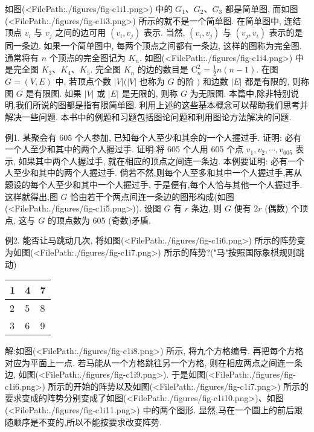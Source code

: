 如图(<FilePath:./figures/fig-c1i1.png>) 中的 $G_1 、 G_2 、 G_3$ 都是简单图, 而如图(<FilePath:./figures/fig-c1i3.png>) 所示的就不是一个简单图.
在简单图中, 连结顶点 $v_i$ 与 $v_j$ 之间的边可用 $\left(v_i, v_j\right)$ 表示.
当然, $\left(v_i, v_j\right)$ 与 $\left(v_j, v_i\right)$ 表示的是同一条边.
如果一个简单图中, 每两个顶点之间都有一条边, 这样的图称为完全图.
通常将有 $n$ 个顶点的完全图记为 $K_n$. 如图(<FilePath:./figures/fig-c1i4.png>) 中是完全图 $K_3 、 K_4 、 K_5$. 完全图 $K_n$ 的边的数目是 $\mathrm{C}_n^2=\frac{1}{2} n(n-1)$.
在图 $G=(V, E)$ 中, 若顶点个数 $|V|(|V|$ 也称为 $G$ 的阶 $)$ 和边数 $|E|$ 都是有限的, 则称图 $G$ 是有限图.
如果 $|V|$ 或 $|E|$ 是无限的, 则称 $G$ 为无限图.
本篇中,除非特别说明,我们所说的图都是指有限简单图.
利用上述的这些基本概念可以帮助我们思考并解决一些问题.
本书中的例题和习题包括图论问题和利用图论方法解决的问题.



例1. 某聚会有 605 个人参加, 已知每个人至少和其余的一个人握过手.
证明: 必有一个人至少和其中的两个人握过手.
证明:将 605 个人用 605 个点 $v_1, v_2, \cdots, v_{605}$ 表示, 如果其中两个人握过手, 就在相应的顶点之间连一条边.
本例要证明: 必有一个人至少和其中的两个人握过手.
倘若不然,则每个人至多和其中一个人握过手,再从题设的每个人至少和其中一个人握过手, 于是便有,每个人恰与其他一个人握过手.
这样就得出,图 $G$ 恰由若干个两点间连一条边的图形构成(如图(<FilePath:./figures/fig-c1i5.png>)).
设图 $G$ 有 $r$ 条边, 则 $G$ 便有 $2 r$ (偶数) 个顶点, 这与 $G$ 的顶点数为 605 (奇数)矛盾.



例2. 能否让马跳动几次, 将如图(<FilePath:./figures/fig-c1i6.png>) 所示的阵势变为如图(<FilePath:./figures/fig-c1i7.png>) 所示的阵势?("马"按照国际象棋规则跳动)
\begin{tabular}{|l|l|l|}
\hline 1 & 4 & 7 \\
\hline 2 & 5 & 8 \\
\hline 3 & 6 & 9 \\
\hline
\end{tabular}
解:如图(<FilePath:./figures/fig-c1i8.png>) 所示, 将九个方格编号.
再把每个方格对应为平面上一点.
若马能从一个方格跳往另一个方格, 则在相应两点之间连一条边, 如图(<FilePath:./figures/fig-c1i9.png>).
于是如图(<FilePath:./figures/fig-c1i6.png>) 所示的开始的阵势以及如图(<FilePath:./figures/fig-c1i7.png>) 所示的要求变成的阵势分别变成了如图(<FilePath:./figures/fig-c1i10.png>)、如图(<FilePath:./figures/fig-c1i11.png>) 中的两个图形.
显然,马在一个圆上的前后跟随顺序是不变的,所以不能按要求改变阵势.



